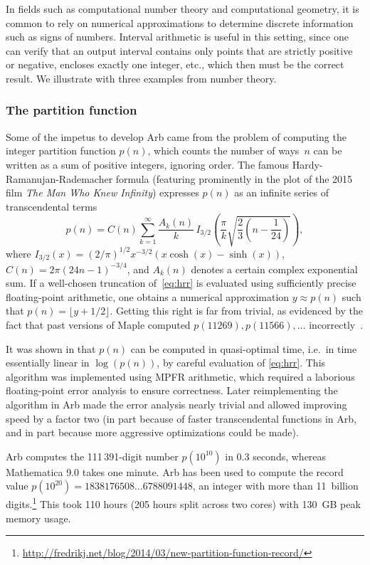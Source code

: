 \documentclass[10pt,journal,compsoc,cspaper]{IEEEtran}
\begin{document}
In fields such as computational number theory and computational geometry,
it is common to rely on numerical
approximations to determine discrete information such as
signs of numbers.
Interval arithmetic is useful in this setting, since one can verify
that an output interval contains only points that are strictly positive
or negative,
encloses exactly one integer, etc.,
which then must be the correct result.
We illustrate with three examples from number theory.

\subsubsection{The partition function}

Some of the impetus to develop Arb
came from the problem of computing
the integer partition function
$p(n)$, which counts the number of ways~$n$ can be written as a sum
of positive integers, ignoring order.
The famous Hardy-Ramanujan-Rademacher formula
(featuring prominently in the plot of the
2015 film \textit{The Man Who Knew Infinity})
expresses $p(n)$ as an infinite
series of transcendental terms
\begin{equation}
p(n)= C(n) \sum_{k=1}^\infty \frac{A_k(n)}{k} \,
   I_{3/2} \left( \frac{\pi}{k} \sqrt{\frac{2}{3} \left(n - \frac{1}{24}\right)} \right),
\label{eq:hrr}
\end{equation}
where
$I_{3/2}(x) = (2/\pi)^{1/2} x^{-3/2} (x \cosh(x) - \sinh(x))$,
$C(n) = 2\pi (24n-1)^{-3/4}$,
and $A_k(n)$ denotes a certain complex exponential sum.
If a well-chosen truncation of~\eqref{eq:hrr} is evaluated using
sufficiently precise floating-point arithmetic, one obtains
a numerical approximation $y \approx p(n)$ such that $p(n) = \lfloor y + 1/2 \rfloor$.
Getting this right is far from trivial, as evidenced by the
fact that past versions of Maple computed
$p(11269), p(11566), \ldots$ incorrectly~\cite{oeismaple}.

It was shown in \cite{Johansson2012hrr} that
$p(n)$ can be computed in quasi-optimal time,
i.e.\ in time essentially linear in $\log(p(n))$,
by careful evaluation of \eqref{eq:hrr}.
This algorithm was implemented using MPFR arithmetic,
which required a laborious floating-point error analysis to
ensure correctness.
Later reimplementing the algorithm in Arb
made the error analysis nearly trivial and allowed improving speed by a factor
two (in part because of faster transcendental functions in Arb,
and in part because more aggressive optimizations could be made).

Arb computes the 111\,391-digit number $p(10^{10})$
in 0.3 seconds, whereas Mathematica 9.0 takes one minute.
Arb has been used
to compute the record value $p(10^{20}) = 1838176508 \ldots 6788091448$, an integer
with more than 11~billion
digits.\footnote{\url{http://fredrikj.net/blog/2014/03/new-partition-function-record/}}
This took 110 hours (205 hours split across two cores)
with 130~GB peak memory usage.
\end{document}
